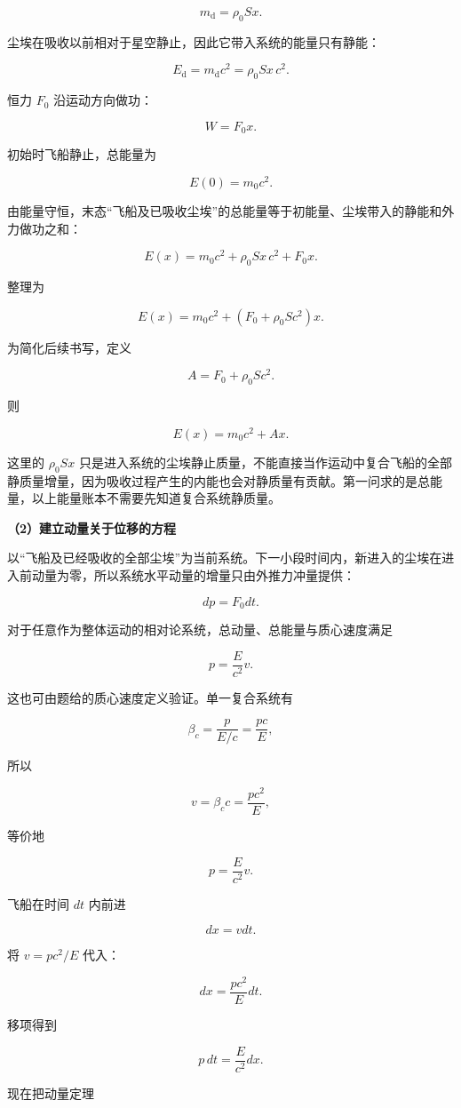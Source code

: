 \documentclass[12pt,a4paper,UTF8]{ctexart}
\begin{document}
\[m_{\mathrm d}=\rho_0Sx.\]

尘埃在吸收以前相对于星空静止，因此它带入系统的能量只有静能：

\[E_{\mathrm d}=m_{\mathrm d}c^2=\rho_0Sx\,c^2.\]

恒力 \(F_0\) 沿运动方向做功：

\[W=F_0x.\]

初始时飞船静止，总能量为

\[E(0)=m_0c^2.\]

由能量守恒，末态``飞船及已吸收尘埃''的总能量等于初能量、尘埃带入的静能和外力做功之和：

\[E(x)=m_0c^2+\rho_0Sx\,c^2+F_0x.\]

整理为

\[\boxed{
E(x)=m_0c^2+\left(F_0+\rho_0Sc^2\right)x
}.\]

为简化后续书写，定义

\[A=F_0+\rho_0Sc^2.\]

则

\[E(x)=m_0c^2+Ax.\]

这里的 \(\rho_0Sx\)
只是进入系统的尘埃静止质量，不能直接当作运动中复合飞船的全部静质量增量，因为吸收过程产生的内能也会对静质量有贡献。第一问求的是总能量，以上能量账本不需要先知道复合系统静质量。

\textbf{（2）建立动量关于位移的方程}

以``飞船及已经吸收的全部尘埃''为当前系统。下一小段时间内，新进入的尘埃在进入前动量为零，所以系统水平动量的增量只由外推力冲量提供：

\[dp=F_0dt.\]

对于任意作为整体运动的相对论系统，总动量、总能量与质心速度满足

\[p=\frac{E}{c^2}v.\]

这也可由题给的质心速度定义验证。单一复合系统有

\[\beta_c=\frac{p}{E/c}=\frac{pc}{E},\]

所以

\[v=\beta_cc=\frac{pc^2}{E},\]

等价地

\[p=\frac{E}{c^2}v.\]

飞船在时间 \(dt\) 内前进

\[dx=vdt.\]

将 \(v=pc^2/E\) 代入：

\[dx=\frac{pc^2}{E}dt.\]

移项得到

\[p\,dt=\frac{E}{c^2}dx.\]

现在把动量定理
\end{document}
